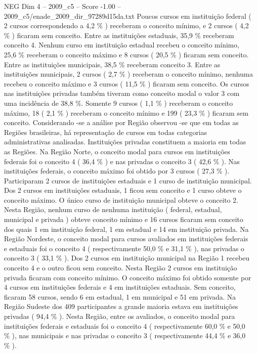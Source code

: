\begin{textsample}{NEG Dim 4 – 2009\_c5 – Score -1.00 – 2009\_c5/enade\_2009\_dir\_97289d15da.txt}
Poucos cursos em instituição federal ( 2 cursos correspondendo a 4,2 \% ) receberam o conceito mínimo, e 2 cursos ( 4,2 \% ) ficaram sem conceito.
Entre as instituições estaduais, 35,9 \% receberam conceito 4.
Nenhum curso em instituição estadual recebeu o conceito mínimo, 25,6 \% receberam o conceito máximo e 8 cursos ( 20,5 \% ) ficaram sem conceito.
Entre as instituições municipais, 38,5 \% receberam conceito 3.
Entre as instituições municipais, 2 cursos ( 2,7 \% ) receberam o conceito mínimo, nenhuma recebeu o conceito máximo e 3 cursos ( 11,5 \% ) ficaram sem conceito.
Os cursos nas instituições privadas também tiveram como conceito modal o valor 3 com uma incidência de 38,8 \%.
Somente 9 cursos ( 1,1 \% ) receberam o conceito máximo, 18 ( 2,1 \% ) receberam o conceito mínimo e 199 ( 23,3 \% ) ficaram sem conceito.
Considerando -se a análise por Região observou -se que em todas as Regiões brasileiras, há representação de cursos em todas categorias administrativas analisadas.
Instituições privadas constituem a maioria em todas as Regiões.
Na Região Norte, o conceito modal para cursos em instituições federais foi o conceito 4 ( 36,4 \% ) e nas privadas o conceito 3 ( 42,6 \% ).
Nas instituições federais, o conceito máximo foi obtido por 3 cursos ( 27,3 \% ).
Participaram 2 cursos de instituições estaduais e 1 curso de instituição municipal.
Dos 2 cursos em instituições estaduais, 1 ficou sem conceito e 1 curso obteve o conceito máximo.
O único curso de instituição municipal obteve o conceito 2.
Nesta Região, nenhum curso de nenhuma instituição ( federal, estadual, municipal e privada ) obteve conceito mínimo e 16 cursos ficaram sem conceito dos quais 1 em instituição federal, 1 em estadual e 14 em instituição privada.
Na Região Nordeste, o conceito modal para cursos avaliados em instituições federais e estaduais foi o conceito 4 ( respectivamente 50,0 \% e 31,1 \% ), nas privadas o conceito 3 ( 33,1 \% ).
Dos 2 cursos em instituição municipal na Região 1 recebeu conceito 4 e o outro ficou sem conceito.
Nesta Região 2 cursos em instituição privada ficaram com conceito mínimo.
O conceito máximo foi obtido somente por 4 cursos em instituições federais e 4 em instituições estaduais.
Sem conceito, ficaram 58 cursos, sendo 6 em estadual, 1 em municipal e 51 em privada.
Na Região Sudeste dos 409 participantes a grande maioria estava em instituições privadas ( 94,4 \% ).
Nesta Região, entre os avaliados, o conceito modal para instituições federais e estaduais foi o conceito 4 ( respectivamente 60,0 \% e 50,0 \% ), nas municipais e nas privadas o conceito 3 ( respectivamente 44,4 \% e 36,0 \% ).

\end{textsample}
